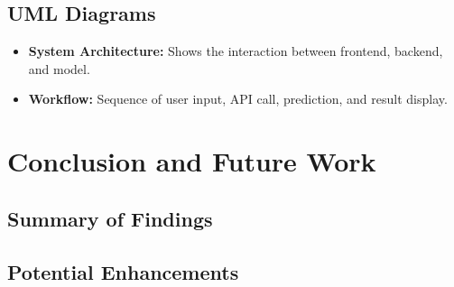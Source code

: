 \documentclass{article}
\begin{document}
\subsection{UML Diagrams}
\begin{itemize}
    \item \textbf{System Architecture:} Shows the interaction between frontend, backend, and model.
    \item \textbf{Workflow:} Sequence of user input, API call, prediction, and result display.
\end{itemize}


\section{Conclusion and Future Work}

\subsection{Summary of Findings}

\subsection{Potential Enhancements}

\newpage



\end{document}
